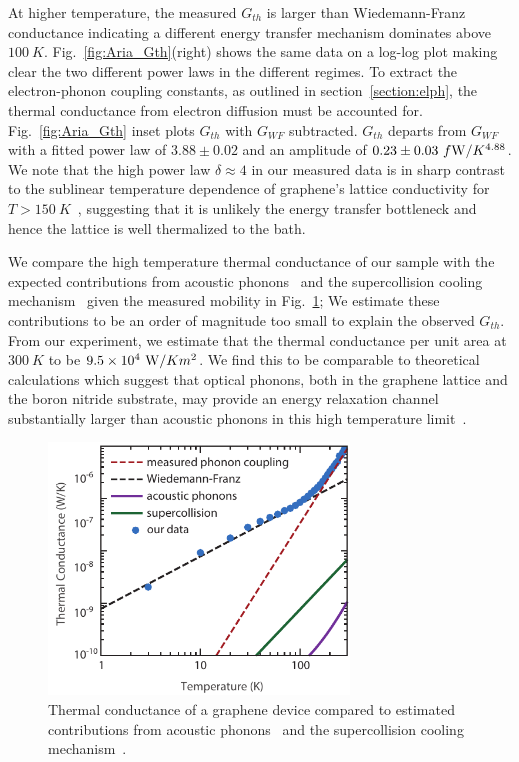 At higher temperature, the measured $G_{th}$ is larger than Wiedemann-Franz conductance indicating a different energy transfer mechanism dominates above $100~K$. Fig.~\ref{fig:Aria_Gth}(right) shows the same data on a log-log plot making clear the two different power laws in the different regimes. To extract the electron-phonon coupling constants, as outlined in section~\ref{section:elph}, the thermal conductance from electron diffusion must be accounted for. Fig.~\ref{fig:Aria_Gth} inset plots $G_{th}$ with $G_{WF}$ subtracted. $G_{th}$ departs from $G_{WF}$ with a fitted power law of $3.88\pm0.02$ and an amplitude of  $0.23\pm 0.03~{f\mathrm{W}}/K^{4.88}$. We note that the high power law $\delta\approx4$ in our measured data is in sharp contrast to the sublinear temperature dependence of graphene's lattice conductivity for $T>150~K$~\cite{seol_two-dimensional_2010}, suggesting that it is unlikely the energy transfer bottleneck and hence the lattice is well thermalized to the bath. 

We compare the high temperature thermal conductance of our sample with the expected contributions from acoustic phonons~\cite{bistritzer_electronic_2009, viljas_electron-phonon_2010} and the supercollision cooling mechanism~\cite{song_disorder-assisted_2012, chen_electron-phonon_2012, betz_supercollision_2013, graham_photocurrent_2013} given the measured mobility in Fig.~\ref{fig:Aria_Eph}; We estimate these contributions to be an order of magnitude too small to explain the observed $G_{th}$. From our experiment, we estimate that the thermal conductance per unit area at $300~K$ to be $9.5\times10^{4}~\mathrm{W}/Km^{2}$. We find this to be comparable to theoretical calculations which suggest that optical phonons, both in the graphene lattice and the boron nitride substrate, may provide an energy relaxation channel substantially larger than acoustic phonons in this high temperature limit~\cite{sohier_phonon-limited_2014, tielrooij_out--plane_2017, viljas_electron-phonon_2010, bistritzer_electronic_2009, schiefele_temperature_2012}.
\begin{figure}
\centering
\includegraphics[width = 80mm]{figures/high_density_graphene/EPh.pdf}
\caption{Thermal conductance of a graphene device compared to estimated contributions from acoustic phonons~\cite{bistritzer_electronic_2009, viljas_electron-phonon_2010} and the supercollision cooling mechanism~\cite{song_disorder-assisted_2012, chen_electron-phonon_2012, betz_supercollision_2013, graham_photocurrent_2013}.}
\label{fig:Aria_Eph}
\end{figure}